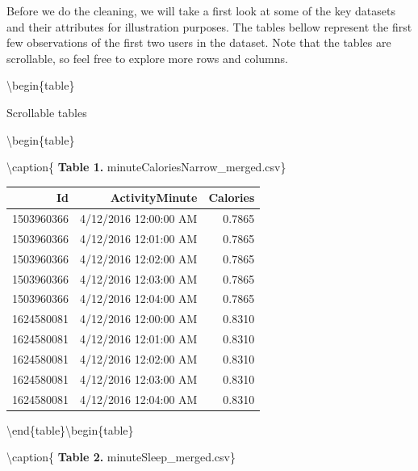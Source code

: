 \documentclass[
]{article}
\begin{document}
Before we do the cleaning, we will take a first look at some of the key
datasets and their attributes for illustration purposes. The tables
bellow represent the first few observations of the first two users in
the dataset. Note that the tables are scrollable, so feel free to
explore more rows and columns.

\textbackslash begin\{table\}

\caption{\label{tab:unnamed-chunk-4}Scrollable tables}

\textbackslash begin\{table\}

\textbackslash caption\{\label{tab:unnamed-chunk-4} \textbf{Table 1.}
minuteCaloriesNarrow\_merged.csv\} \centering

\begin{tabular}[t]{r|r|r}
\hline
Id & ActivityMinute & Calories\\
\hline
1503960366 & 4/12/2016 12:00:00 AM & 0.7865\\
\hline
1503960366 & 4/12/2016 12:01:00 AM & 0.7865\\
\hline
1503960366 & 4/12/2016 12:02:00 AM & 0.7865\\
\hline
1503960366 & 4/12/2016 12:03:00 AM & 0.7865\\
\hline
1503960366 & 4/12/2016 12:04:00 AM & 0.7865\\
\hline
1624580081 & 4/12/2016 12:00:00 AM & 0.8310\\
\hline
1624580081 & 4/12/2016 12:01:00 AM & 0.8310\\
\hline
1624580081 & 4/12/2016 12:02:00 AM & 0.8310\\
\hline
1624580081 & 4/12/2016 12:03:00 AM & 0.8310\\
\hline
1624580081 & 4/12/2016 12:04:00 AM & 0.8310\\
\hline
\end{tabular}

\textbackslash end\{table\}\textbackslash begin\{table\}

\textbackslash caption\{\label{tab:unnamed-chunk-4} \textbf{Table 2.}
minuteSleep\_merged.csv\} \centering
\end{document}
